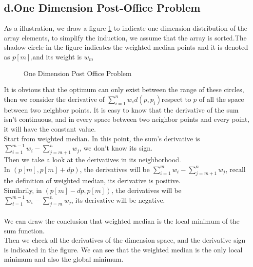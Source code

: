 \documentclass[oneside]{homework} %
\begin{document}
\subsection* {d.One Dimension Post-Office Problem}
As a illustration, we draw a figure \ref{fig:1dim} to indicate one-dimension distribution of the array elements, to simplify the induction, we assume that the array is sorted.The shadow circle in the figure indicates the weighted median points and it is denoted as $p[m]$,and its weight is $w_{m}$
\begin{figure}[h]
  \centering
  \caption{One Dimension Post Office Problem}
  \label{fig:1dim}
\end{figure}

It is obvious that the optimum can only exist between the range of these circles, then we consider the derivative of $\sum_{i=1}^{n}w_{i}d(p,p_{i})$respect to $p$ of all the space between two neighbor points. It is easy to know that the derivative of the sum isn't continuous, and in every space between two neighbor points and every point, it will have the constant value.
\\
Start from weighted median. In this point, the sum's derivative is $\sum_{i=1}^{m-1}w_{i}-\sum_{j=m+1}^{n}w_{j}$, we don't know its sign.\\ 
Then we take a look at the derivatives in its neighborhood.\\
In $(p[m],p[m]+dp)$, the derivatives will be $\sum_{i=1}^{m}w_{i}-\sum_{j=m+1}^{n}w_{j}$, recall the definition of weighted median, its derivative is positive. \\
Similarily, in $(p[m]-dp,p[m])$, the derivatives will be $\sum_{i=1}^{m-1}w_{i}-\sum_{j=m}^{n}w_{j}$, its derivative will be negative.\\
\\ We can draw the conclusion that weighted median is the local minimum of the sum function. \\
Then we check all the derivatives of the dimension space, and the derivative sign is indicated in the figure. We can see that the weighted median is the only local minimum and also the global minimum.
\end{document}
